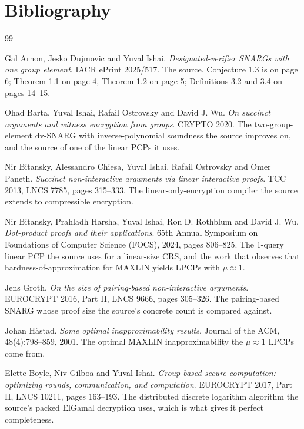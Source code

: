 \documentclass{conjura-conjecture}
\begin{document}
\section{Bibliography}

\begin{conjurabibliography}{99}

Gal Arnon, Jesko Dujmovic and Yuval Ishai.
\emph{Designated-verifier SNARGs with one group element}.
IACR ePrint 2025/517.
The source. Conjecture 1.3 is on page 6; Theorem 1.1 on page 4,
Theorem 1.2 on page 5; Definitions 3.2 and 3.4 on pages 14--15.

Ohad Barta, Yuval Ishai, Rafail Ostrovsky and David J. Wu.
\emph{On succinct arguments and witness encryption from groups}.
CRYPTO 2020.
The two-group-element dv-SNARG with inverse-polynomial soundness the
source improves on, and the source of one of the linear PCPs it uses.

Nir Bitansky, Alessandro Chiesa, Yuval Ishai, Rafail Ostrovsky and Omer
Paneth.
\emph{Succinct non-interactive arguments via linear interactive proofs}.
TCC 2013, LNCS 7785, pages 315--333.
The linear-only-encryption compiler the source extends to compressible
encryption.

Nir Bitansky, Prahladh Harsha, Yuval Ishai, Ron D. Rothblum and
David J. Wu.
\emph{Dot-product proofs and their applications}.
65th Annual Symposium on Foundations of Computer Science (FOCS), 2024,
pages 806--825.
The 1-query linear PCP the source uses for a linear-size CRS, and the
work that observes that hardness-of-approximation for $\mathrm{MAXLIN}$
yields LPCPs with $\mu \approx 1$.

Jens Groth.
\emph{On the size of pairing-based non-interactive arguments}.
EUROCRYPT 2016, Part II, LNCS 9666, pages 305--326.
The pairing-based SNARG whose proof size the source's concrete count is
compared against.

Johan H\aa{}stad.
\emph{Some optimal inapproximability results}.
Journal of the ACM, 48(4):798--859, 2001.
The optimal $\mathrm{MAXLIN}$ inapproximability the $\mu \approx 1$ LPCPs
come from.

Elette Boyle, Niv Gilboa and Yuval Ishai.
\emph{Group-based secure computation: optimizing rounds, communication,
and computation}.
EUROCRYPT 2017, Part II, LNCS 10211, pages 163--193.
The distributed discrete logarithm algorithm the source's packed ElGamal
decryption uses, which is what gives it perfect completeness.

\end{conjurabibliography}
\end{document}
